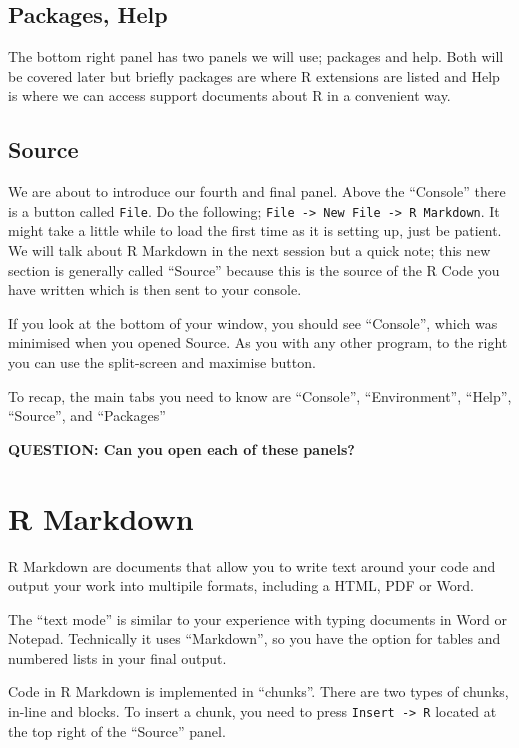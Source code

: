 \documentclass[]{book}
\begin{document}
\hypertarget{packages-help}{%
\subsection{Packages, Help}\label{packages-help}}

The bottom right panel has two panels we will use; packages and help. Both will be covered later but briefly packages are where R extensions are listed and Help is where we can access support documents about R in a convenient way.

\hypertarget{source}{%
\subsection{Source}\label{source}}

We are about to introduce our fourth and final panel. Above the ``Console'' there is a button called \texttt{File}. Do the following; \texttt{File\ -\textgreater{}\ New\ File\ -\textgreater{}\ R\ Markdown}. It might take a little while to load the first time as it is setting up, just be patient. We will talk about R Markdown in the next session but a quick note; this new section is generally called ``Source'' because this is the source of the R Code you have written which is then sent to your console.

If you look at the bottom of your window, you should see ``Console'', which was minimised when you opened Source. As you with any other program, to the right you can use the split-screen and maximise button.

To recap, the main tabs you need to know are ``Console'', ``Environment'', ``Help'', ``Source'', and ``Packages''

\textbf{QUESTION: Can you open each of these panels?}

\hypertarget{r-markdown}{%
\section{R Markdown}\label{r-markdown}}

R Markdown are documents that allow you to write text around your code and output your work into multipile formats, including a HTML, PDF or Word.

The ``text mode'' is similar to your experience with typing documents in Word or Notepad. Technically it uses ``Markdown'', so you have the option for tables and numbered lists in your final output.

Code in R Markdown is implemented in ``chunks''. There are two types of chunks, in-line and blocks. To insert a chunk, you need to press \texttt{Insert\ -\textgreater{}\ R} located at the top right of the ``Source'' panel.
\end{document}

